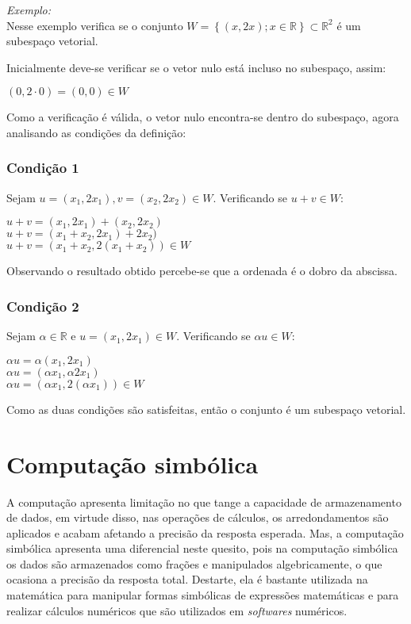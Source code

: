 \textit{Exemplo:}\\
Nesse exemplo verifica se o conjunto $W = \left \{ (x, 2x) ; x \in \mathbb{R} \right \} \subset \mathbb{R}^2$ é um subespaço vetorial.

Inicialmente deve-se verificar se o vetor nulo está incluso no subespaço, assim:
\begin{center}
    $(0, 2\cdot0) = (0,0) \in W$    
\end{center}
Como a verificação é válida, o vetor nulo encontra-se dentro do subespaço, agora analisando as condições da definição:

\subsubsection{Condição 1}
\noindent Sejam $u = (x_{1}, 2x_{1}), v = (x_{2}, 2x_{2}) \in W$. Verificando se $u + v \in W$:
\begin{center}
    $u + v = (x_{1}, 2x_{1}) + (x_{2}, 2x_{2})$\\
    $u + v = (x_{1} + x_{2}, 2x_{1}) + 2x_{2})$\\
    $u + v = (x_{1} + x_{2}, 2(x_{1} + x_{2})) \in W$\\
\end{center}
Observando o resultado obtido percebe-se que a ordenada é o dobro da abscissa.

\subsubsection{Condição 2}
\noindent Sejam $\alpha \in \mathbb{R}$ e $u = (x_{1}, 2x_{1}) \in W$. Verificando se $\alpha u \in W$:
\begin{center}
    $\alpha u = \alpha(x_{1}, 2x_{1})$\\
    $\alpha u = (\alpha x_{1}, \alpha 2x_{1})$\\
    $\alpha u = (\alpha x_{1}, 2(\alpha x_{1})) \in W$\\
\end{center}
Como as duas condições são satisfeitas, então o conjunto é um subespaço vetorial.


\section{Computação simbólica}
\noindent A computação apresenta limitação no que tange a capacidade de armazenamento de dados, em virtude disso, nas operações de cálculos, os arredondamentos são aplicados e acabam afetando a precisão da resposta esperada. Mas, a computação simbólica apresenta uma diferencial neste quesito, pois na computação simbólica os dados são armazenados como frações e manipulados algebricamente, o que ocasiona a precisão da resposta total. Destarte, ela é bastante utilizada na matemática para manipular formas simbólicas de expressões matemáticas e para realizar cálculos numéricos que são utilizados em \textit{softwares} numéricos.

